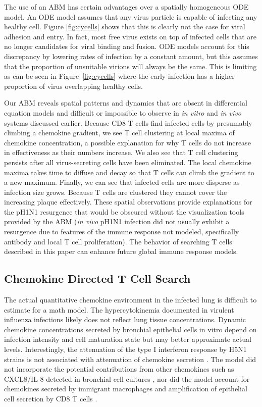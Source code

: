 \documentclass[10pt]{article}
\begin{document}
The use of an ABM has certain advantages over a spatially homogeneous ODE model.  An ODE model assumes that any virus particle is capable of infecting any healthy cell.  Figure \ref{fig:cycells} shows that this is clearly not the case for viral adhesion and entry.  In fact, most free virus exists on top of infected cells that are no longer candidates for viral binding and fusion.  ODE models account for this discrepancy by lowering rates of infection by a constant amount, but this assumes that the proportion of unsuitable virions will always be the same.  This is limiting as can be seen in Figure~\ref{fig:cycells} where the early infection has a higher proportion of virus overlapping healthy cells.

Our ABM reveals spatial patterns and dynamics that are absent in differential equation models and difficult or impossible to observe in \textit{in vitro} and \textit{in vivo} systems discussed earlier.  Because CD8 T cells find infected cells by presumably climbing a chemokine gradient, we see T cell clustering at local maxima of chemokine concentration, a possible explanation for why T cells do not increase in effectiveness as their numbers increase.   We also see that T cell clustering persists after all virus-secreting cells have been eliminated.  The local chemokine maxima takes time to diffuse and decay so that T cells can climb the gradient to a new maximum.  Finally, we can see that infected cells are more disperse as infection size grows.  Because T cells are clustered they cannot cover the increasing plaque effectively.  These spatial observations provide explanations for the pH1N1 resurgence that would be obscured without the visualization tools provided by the ABM (\textit{in vivo} pH1N1 infection did not usually exhibit a resurgence due to features of the immune response not modeled, specifically antibody and local T cell proliferation).   The behavior of searching T cells described in this paper can enhance future global immune response models.

\subsection*{Chemokine Directed T Cell Search}

The actual quantitative chemokine environment in the infected lung is difficult to estimate for a math model.  The hypercytokinemia documented in virulent influenza infections \cite{DeJong2006} likely does not reflect lung tissue concentrations.  Dynamic chemokine concentrations secreted by bronchial epithelial cells in vitro depend on infection intensity and cell maturation state \cite{Mitchell2011, Chan2010, Chan2005, Zeng2011} but may better approximate actual levels.  Interestingly, the attenuation of the type I interferon response by H5N1 strains is not associated with attenuation of chemokine secretion \cite{Zeng2007}.  The model did not incorporate the potential contributions from other chemokines such as CXCL8/IL-8 detected in bronchial cell cultures \cite{Matsukura1996, Arndt2002}, nor did the model account for chemokines secreted by immigrant macrophages \cite{Julkunen2000} and amplification of epithelial cell secretion by CD8 T cells \cite{Zhao2000}.
\end{document}
